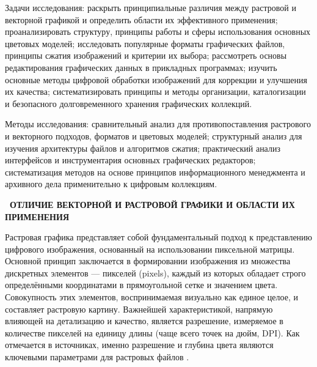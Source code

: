 \documentclass{SibFU-docs}
\begin{document}
Задачи исследования: раскрыть принципиальные различия между растровой и векторной графикой и определить области их эффективного применения; проанализировать структуру, принципы работы и сферы использования основных цветовых моделей; исследовать популярные форматы графических файлов, принципы сжатия изображений и критерии их выбора; рассмотреть основы редактирования графических данных в прикладных программах; изучить основные методы цифровой обработки изображений для коррекции и улучшения их качества; систематизировать принципы и методы организации, каталогизации и безопасного долговременного хранения графических коллекций.

Методы исследования: сравнительный анализ для противопоставления растрового и векторного подходов, форматов и цветовых моделей; структурный анализ для изучения архитектуры файлов и алгоритмов сжатия; практический анализ интерфейсов и инструментария основных графических редакторов; систематизация методов на основе принципов информационного менеджмента и архивного дела применительно к цифровым коллекциям.

\newpage
\vspace*{-2.5em}
\begin{center}\textbf{\thesection\ ОТЛИЧИЕ ВЕКТОРНОЙ И РАСТРОВОЙ ГРАФИКИ И ОБЛАСТИ ИХ ПРИМЕНЕНИЯ}\end{center}
\vspace*{-1.5em}

Растровая графика представляет собой фундаментальный подход к представлению цифрового изображения, основанный на использовании пиксельной матрицы. Основной принцип заключается в формировании изображения из множества дискретных элементов — пикселей (pixels), каждый из которых обладает строго определёнными координатами в прямоугольной сетке и значением цвета. Совокупность этих элементов, воспринимаемая визуально как единое целое, и составляет растровую картину. Важнейшей характеристикой, напрямую влияющей на детализацию и качество, является разрешение, измеряемое в количестве пикселей на единицу длины (чаще всего точек на дюйм, DPI). Как отмечается в источниках, именно разрешение и глубина цвета являются ключевыми параметрами для растровых файлов \cite{grafika_formats}.
\end{document}
